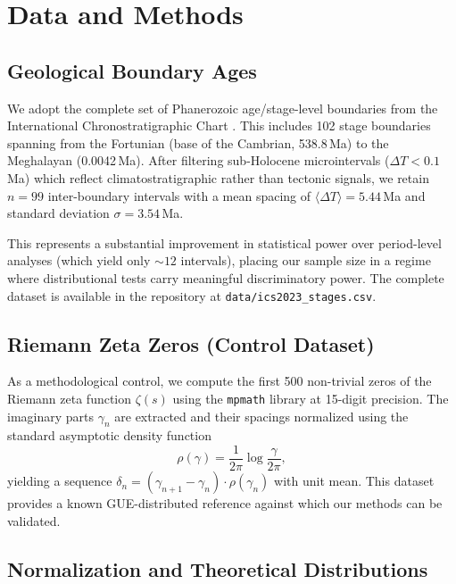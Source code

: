 \documentclass[12pt,a4paper]{article}
\begin{document}
\section{Data and Methods}

\subsection{Geological Boundary Ages}

We adopt the complete set of Phanerozoic age/stage-level boundaries from the International Chronostratigraphic Chart \citep[ICS, version 2023/09;][]{cohen2023}. This includes 102 stage boundaries spanning from the Fortunian (base of the Cambrian, 538.8\,Ma) to the Meghalayan (0.0042\,Ma). After filtering sub-Holocene microintervals ($\Delta T < 0.1$\,Ma) which reflect climatostratigraphic rather than tectonic signals, we retain $n = 99$ inter-boundary intervals with a mean spacing of $\langle\Delta T\rangle = 5.44$\,Ma and standard deviation $\sigma = 3.54$\,Ma.

This represents a substantial improvement in statistical power over period-level analyses (which yield only ${\sim}12$ intervals), placing our sample size in a regime where distributional tests carry meaningful discriminatory power. The complete dataset is available in the repository at \texttt{data/ics2023\_stages.csv}.

\subsection{Riemann Zeta Zeros (Control Dataset)}

As a methodological control, we compute the first 500 non-trivial zeros of the Riemann zeta function $\zeta(s)$ using the \texttt{mpmath} library at 15-digit precision. The imaginary parts $\gamma_n$ are extracted and their spacings normalized using the standard asymptotic density function
\begin{equation}
    \rho(\gamma) = \frac{1}{2\pi} \log\frac{\gamma}{2\pi},
\end{equation}
yielding a sequence $\delta_n = (\gamma_{n+1} - \gamma_n) \cdot \rho(\gamma_n)$ with unit mean. This dataset provides a known GUE-distributed reference against which our methods can be validated.

\subsection{Normalization and Theoretical Distributions}
\end{document}
